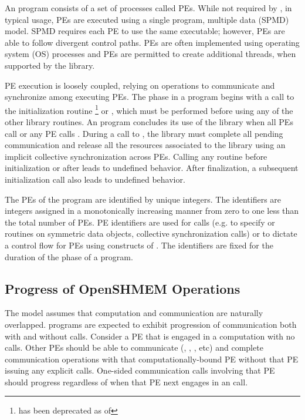 An \openshmem program consists of a set of \openshmem processes called
\acp{PE}.  While not required by \openshmem, in typical usage, \acp{PE} are
executed using a single program, multiple data (\ac{SPMD}) model.  \ac{SPMD}
requires each \ac{PE} to use the same executable; however, \acp{PE} are able to
follow divergent control paths.  \acp{PE} are often implemented using operating
system (\ac{OS}) processes and \acp{PE} are permitted to create additional
threads, when supported by the \openshmem library.

\ac{PE} execution is loosely coupled, relying on \openshmem operations to
communicate and synchronize among executing \acp{PE}.  The \openshmem phase in
a program begins with a call to the initialization routine %
\footnote{ has been deprecated as of \openshmem[1.2]}
or , which must be performed before using any of the
other \openshmem library routines. 
An \openshmem program concludes its use of the \openshmem library when all \acp{PE} call
 or any \ac{PE} calls .
During a call to , the \openshmem library must
complete all pending communication and release all the resources associated to
the library using an implicit collective synchronization across \acp{PE}.
Calling any \openshmem routine before initialization or after
 leads to undefined behavior. After finalization, a
subsequent initialization call also leads to undefined behavior.

The \acp{PE} of the \openshmem program are identified by unique integers.  The
identifiers are integers assigned in a monotonically increasing manner from zero
to one less than the total number of \acp{PE}. \ac{PE} identifiers are used for
\openshmem calls (e.g. to specify  or  routines on symmetric
data objects, collective synchronization calls) or to dictate a control flow for
\acp{PE} using constructs of \Cstd. The identifiers are fixed for
the duration of the \openshmem phase of a program.

\subsection{Progress of OpenSHMEM Operations}\label{subsec:progress}

The \openshmem model assumes that computation and communication are naturally
overlapped. \openshmem programs are expected to exhibit progression of
communication both with and without \openshmem calls. Consider a \ac{PE} that is
engaged in a computation with no \openshmem calls. Other \acp{PE} should be able
to communicate (, , , etc) and
complete communication operations with that computationally-bound \ac{PE}
without that \ac{PE} issuing any explicit \openshmem calls. One-sided \openshmem
communication calls involving that \ac{PE} should progress regardless of when
that \ac{PE} next engages in an \openshmem call.

